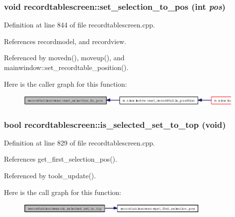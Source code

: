 \subsubsection{\setlength{\rightskip}{0pt plus 5cm}void recordtablescreen::set\_\-selection\_\-to\_\-pos (int {\em pos})}\label{classrecordtablescreen_3694df3f0aae7c3b1ea3913e81b94f90}




Definition at line 844 of file recordtablescreen.cpp.

References recordmodel, and recordview.

Referenced by movedn(), moveup(), and mainwindow::set\_\-recordtable\_\-position().

Here is the caller graph for this function:\begin{figure}[H]
\begin{center}
\leavevmode
\includegraphics[width=388pt]{classrecordtablescreen_3694df3f0aae7c3b1ea3913e81b94f90_icgraph}
\end{center}
\end{figure}
\subsubsection{\setlength{\rightskip}{0pt plus 5cm}bool recordtablescreen::is\_\-selected\_\-set\_\-to\_\-top (void)}\label{classrecordtablescreen_c84c840f480e4e03017e4f3056388d3d}




Definition at line 829 of file recordtablescreen.cpp.

References get\_\-first\_\-selection\_\-pos().

Referenced by tools\_\-update().

Here is the call graph for this function:\begin{figure}[H]
\begin{center}
\leavevmode
\includegraphics[width=269pt]{classrecordtablescreen_c84c840f480e4e03017e4f3056388d3d_cgraph}
\end{center}
\end{figure}
